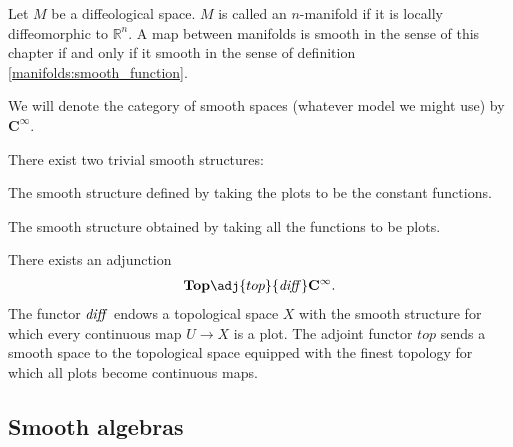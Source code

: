 
    \begin{adefinition}[Manifold]
        Let $M$ be a diffeological space. $M$ is called an $n$-manifold if it is locally diffeomorphic to $\mathbb{R}^n$. A map between manifolds is smooth in the sense of this chapter if and only if it smooth in the sense of definition \ref{manifolds:smooth_function}.
    \end{adefinition}

    \begin{notation}
        We will denote the category of smooth spaces (whatever model we might use) by $\mathbf{C^\infty}$.
    \end{notation}

    There exist two trivial smooth structures:
    \begin{example}
        The smooth structure defined by taking the plots to be the constant functions.
    \end{example}
    \begin{example}
        The smooth structure obtained by taking all the functions to be plots.
    \end{example}

    \begin{property}
        There exists an adjunction
        \begin{gather}
            \mathbf{Top}\adj{top}{\text{\textit{diff}}}\mathbf{C^\infty}.
        \end{gather}
        The functor $\text{\textit{diff}}$ endows a topological space $X$ with the smooth structure for which every continuous map $U\rightarrow X$ is a plot. The adjoint functor $top$ sends a smooth space to the topological space equipped with the finest topology for which all plots become continuous maps.
    \end{property}

\subsection{Smooth algebras}

